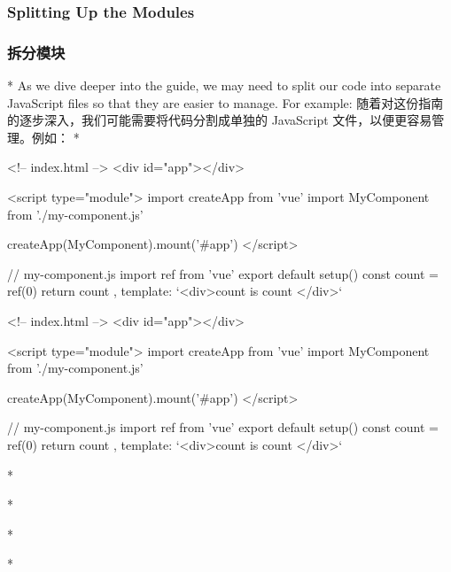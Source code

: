 \begin{paracol}{2}
\subsubsection{Splitting Up the Modules}
\switchcolumn
\subsubsection{拆分模块}
\switchcolumn[0]*%
As we dive deeper into the guide, we may need to split our code into
separate JavaScript files so that they are easier to manage. For
example:
\switchcolumn
随着对这份指南的逐步深入，我们可能需要将代码分割成单独的 JavaScript
文件，以便更容易管理。例如：
\switchcolumn[0]*%
\begin{codeHtml}
<!-- index.html -->
<div id="app"></div>

<script type="module">
    import { createApp } from 'vue'
    import MyComponent from './my-component.js'

    createApp(MyComponent).mount('#app')
</script>
\end{codeHtml}  

\begin{codeJs}
// my-component.js
import { ref } from 'vue'
export default {
    setup() {
    const count = ref(0)
    return { count }
    },
    template: `<div>count is {{ count }}</div>`
}
\end{codeJs}  
\switchcolumn
\begin{codeHtml}
<!-- index.html -->
<div id="app"></div>

<script type="module">
    import { createApp } from 'vue'
    import MyComponent from './my-component.js'

    createApp(MyComponent).mount('#app')
</script>
\end{codeHtml}  

\begin{codeJs}
// my-component.js
import { ref } from 'vue'
export default {
    setup() {
    const count = ref(0)
    return { count }
    },
    template: `<div>count is {{ count }}</div>`
}
\end{codeJs}  

\switchcolumn[0]*%

\switchcolumn

\switchcolumn[0]*%

\switchcolumn


\switchcolumn[0]*%

\switchcolumn

\switchcolumn[0]*%


\end{paracol}
